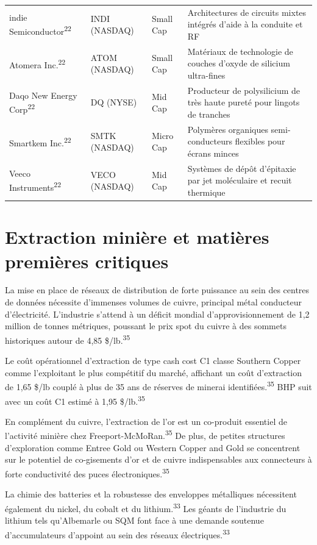 \documentclass[11pt,a4paper]{article}
\begin{document}
\begin{longtable}{p{3cm} p{3.5cm} p{3cm} p{5cm}}
indie Semiconductor\textsuperscript{22} & INDI (NASDAQ) & Small Cap & Architectures de circuits mixtes intégrés d'aide à la conduite et RF \\
Atomera Inc.\textsuperscript{22} & ATOM (NASDAQ) & Small Cap & Matériaux de technologie de couches d'oxyde de silicium ultra-fines \\
Daqo New Energy Corp\textsuperscript{22} & DQ (NYSE) & Mid Cap & Producteur de polysilicium de très haute pureté pour lingots de tranches \\
Smartkem Inc.\textsuperscript{22} & SMTK (NASDAQ) & Micro Cap & Polymères organiques semi-conducteurs flexibles pour écrans minces \\
Veeco Instruments\textsuperscript{22} & VECO (NASDAQ) & Mid Cap & Systèmes de dépôt d'épitaxie par jet moléculaire et recuit thermique \\
\bottomrule
\end{longtable}

\section*{Extraction minière et matières premières critiques}

La mise en place de réseaux de distribution de forte puissance au sein des centres de données nécessite d'immenses volumes de cuivre, principal métal conducteur d'électricité. L'industrie s'attend à un déficit mondial d'approvisionnement de 1,2 million de tonnes métriques, poussant le prix spot du cuivre à des sommets historiques autour de 4,85 \$/lb.\textsuperscript{35}

Le coût opérationnel d'extraction de type cash cost C1 classe Southern Copper comme l'exploitant le plus compétitif du marché, affichant un coût d'extraction de 1,65 \$/lb couplé à plus de 35 ans de réserves de minerai identifiées.\textsuperscript{35} BHP suit avec un coût C1 estimé à 1,95 \$/lb.\textsuperscript{35}

En complément du cuivre, l'extraction de l'or est un co-produit essentiel de l'activité minière chez Freeport-McMoRan.\textsuperscript{35} De plus, de petites structures d'exploration comme Entree Gold ou Western Copper and Gold se concentrent sur le potentiel de co-gisements d'or et de cuivre indispensables aux connecteurs à forte conductivité des puces électroniques.\textsuperscript{35}

La chimie des batteries et la robustesse des enveloppes métalliques nécessitent également du nickel, du cobalt et du lithium.\textsuperscript{33} Les géants de l'industrie du lithium tels qu'Albemarle ou SQM font face à une demande soutenue d'accumulateurs d'appoint au sein des réseaux électriques.\textsuperscript{33}
\end{document}
